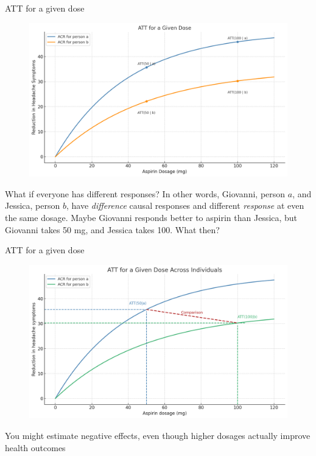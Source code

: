 \documentclass{beamer}
\begin{document}
\begin{frame}{ATT for a given dose}

\begin{figure}
\begin{center}
             \includegraphics[scale=0.3]{./lecture_includes/acrt_fig2.png}
\end{center}
\end{figure}

What if everyone has different responses?  In other words, Giovanni, person $a$, and Jessica, person $b$, have \emph{difference} causal responses and different \emph{response} at even the same dosage.  Maybe Giovanni responds better to aspirin than Jessica, but Giovanni takes 50 mg, and Jessica takes 100.  What then?

\end{frame}

\begin{frame}{ATT for a given dose}

\begin{figure}
\begin{center}
             \includegraphics[scale=0.3]{./lecture_includes/acrt_fig2b.png}
\end{center}
\end{figure}

You might estimate negative effects, even though higher dosages actually improve health outcomes

\end{frame}
\end{document}

